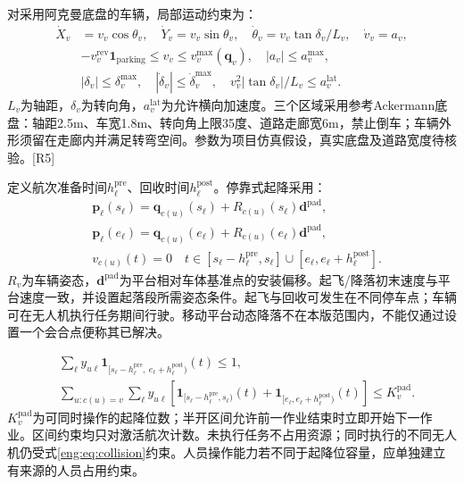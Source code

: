 \noindent 对采用阿克曼底盘的车辆，局部运动约束为：
\begin{align}
 \dot X_v&=v_v\cos\theta_v,\quad \dot Y_v=v_v\sin\theta_v,\quad
 \dot\theta_v=v_v\tan\delta_v/L_v,\quad \dot v_v=a_v,\\
 &-v_v^{\mathrm{rev}}\mathbf1_{\mathrm{parking}}\le v_v\le v_v^{\max}(\mathbf q_v),\quad |a_v|\le a_v^{\max},\\
 &|\delta_v|\le\delta_v^{\max},\quad|\dot\delta_v|\le\dot\delta_v^{\max},\quad
 v_v^2|\tan\delta_v|/L_v\le a_v^{\mathrm{lat}}.
 \label{eng:eq:ugv}
\end{align}
\noindent $L_v$为轴距，$\delta_v$为转向角，$a_v^{\mathrm{lat}}$为允许横向加速度。三个区域采用参考Ackermann底盘：轴距2.5m、车宽1.8m、转向角上限35度、道路走廊宽6m，禁止倒车；车辆外形须留在走廊内并满足转弯空间。参数为项目仿真假设，真实底盘及道路宽度待核验。[R5]

\noindent 定义航次准备时间$h_\ell^{\mathrm{pre}}$、回收时间$h_\ell^{\mathrm{post}}$。停靠式起降采用：
\begin{align}
 &\mathbf p_\ell(s_\ell)=\mathbf q_{c(u)}(s_\ell)+R_{c(u)}(s_\ell)\mathbf d^{\mathrm{pad}},\\
 &\mathbf p_\ell(e_\ell)=\mathbf q_{c(u)}(e_\ell)+R_{c(u)}(e_\ell)\mathbf d^{\mathrm{pad}},\\
 &v_{c(u)}(t)=0\quad t\in[s_\ell-h_\ell^{\mathrm{pre}},s_\ell]
 \cup[e_\ell,e_\ell+h_\ell^{\mathrm{post}}].\label{eng:eq:rendezvous}
\end{align}
\noindent $R_v$为车辆姿态，$\mathbf d^{\mathrm{pad}}$为平台相对车体基准点的安装偏移。起飞/降落初末速度与平台速度一致，并设置起落段所需姿态条件。起飞与回收可发生在不同停车点；车辆可在无人机执行任务期间行驶。移动平台动态降落不在本版范围内，不能仅通过设置一个会合点便称其已解决。

\begin{align}
 &\sum_{\ell}y_{u\ell}\mathbf1_{[s_\ell-h_\ell^{\mathrm{pre}},\ e_\ell+h_\ell^{\mathrm{post}})}(t)\le1,\\
 &\sum_{u:c(u)=v}\sum_\ell y_{u\ell}\left[\mathbf1_{[s_\ell-h_\ell^{\mathrm{pre}},s_\ell)}(t)
 +\mathbf1_{[e_\ell,e_\ell+h_\ell^{\mathrm{post}})}(t)\right]\le K_v^{\mathrm{pad}}.
 \label{eng:eq:pad}
\end{align}
\noindent $K_v^{\mathrm{pad}}$为可同时操作的起降位数；半开区间允许前一作业结束时立即开始下一作业。区间约束均只对激活航次计数。未执行任务不占用资源；同时执行的不同无人机仍受式\eqref{eng:eq:collision}约束。人员操作能力若不同于起降位容量，应单独建立有来源的人员占用约束。
\clearpage

